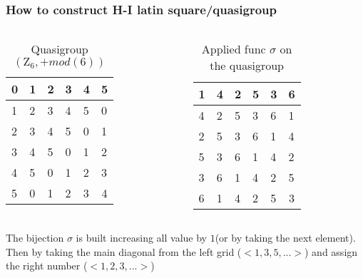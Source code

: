 \begin{frame}
\frametitle{How to construct H-I latin square/quasigroup}

\begin{columns}
	\pause[1]
	\begin{table}
		\centering
		\begin{tabular}{|l|l|l|l|l|l|} 
			\hline
			0 & 1 & 2 & 3 & 4 & 5                       \\ 
			\hline
			1 & 2 & 3 & 4 & 5 & 0                       \\ 
			\hline
			2 & 3 & 4 & 5 & 0 & 1                       \\ 
			\hline
			3 & 4 & 5 & 0 & 1 & 2                       \\ 
			\hline
			4 & 5 & 0 & 1 & 2 & 3                       \\ 
			\hline
			5 & 0 & 1 & 2 & 3 & \multicolumn{1}{c|}{4}  \\
			\hline
		\end{tabular}
	\caption{Quasigroup $(\mathrm{Z}_6, + mod(6))$}
	\end{table}

	\pause[3]
	\begin{table}
		\centering
		\begin{tabular}{|l|l|l|l|l|l|} 
			\hline
			1 & 4 & 2 & 5 & 3 & 6                       \\ 
			\hline
			4 & 2 & 5 & 3 & 6 & 1                       \\ 
			\hline
			2 & 5 & 3 & 6 & 1 & 4                       \\ 
			\hline
			5 & 3 & 6 & 1 & 4 & 2                       \\ 
			\hline
			3 & 6 & 1 & 4 & 2 & 5                       \\ 
			\hline
			6 & 1 & 4 & 2 & 5 & \multicolumn{1}{c|}{3}  \\
			\hline
		\end{tabular}
	
	\caption{Applied func $\sigma$ on the quasigroup}
	\end{table}
	
\end{columns}

\pause[2]
The bijection $\sigma$ is built increasing all value by $1$(or by taking the next element). Then by taking the main diagonal from the left grid ($<1,3,5,...>$) and assign the right number ($<1,2,3,...>$) 
\end{frame}



